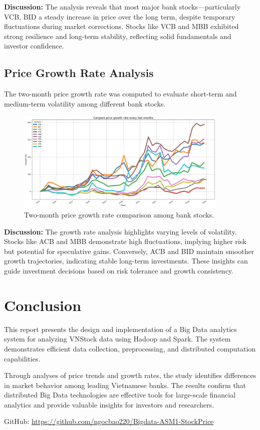 \documentclass[12pt,a4paper]{article}
\begin{document}
\textbf{Discussion:}  
The analysis reveals that most major bank stocks—particularly VCB, BID  a steady increase in price over the long term, despite temporary fluctuations during market corrections.  
Stocks like VCB and MBB exhibited strong resilience and long-term stability, reflecting solid fundamentals and investor confidence.

\subsection{Price Growth Rate Analysis}
The two-month price growth rate was computed to evaluate short-term and medium-term volatility among different bank stocks.

\begin{figure}[h!]
    \centering
    \includegraphics[width=0.9\textwidth]{price_growth_rate.png}
    \caption{Two-month price growth rate comparison among bank stocks.}
    \label{fig:growth}
\end{figure}

\textbf{Discussion:}  
The growth rate analysis highlights varying levels of volatility.  
Stocks like ACB and MBB demonstrate high fluctuations, implying higher risk but potential for speculative gains.  
Conversely, ACB and BID maintain smoother growth trajectories, indicating stable long-term investments.  
These insights can guide investment decisions based on risk tolerance and growth consistency.

\section{Conclusion}

This report presents the design and implementation of a Big Data analytics system for analyzing VNStock data using Hadoop and Spark.  
The system demonstrates efficient data collection, preprocessing, and distributed computation capabilities.  

Through analyses of price trends and growth rates, the study identifies differences in market behavior among leading Vietnamese banks.  
The results confirm that distributed Big Data technologies are effective tools for large-scale financial analytics and provide valuable insights for investors and researchers.

\vspace{1cm}
GitHub: \url{https://github.com/ngocbao220/Bigdata-ASM1-StockPrice}
\end{document}
